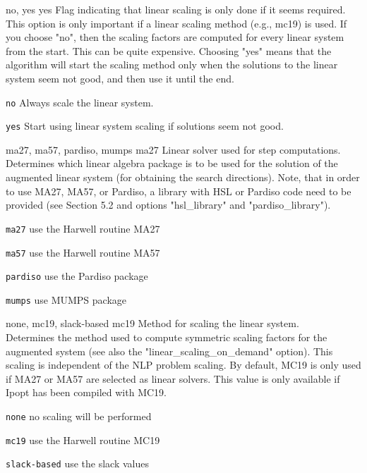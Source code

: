 %
{\ttfamily no, yes}%
{yes}%
{Flag indicating that linear scaling is only done if it seems required.\\
This option is only important if a linear scaling method (e.g., mc19) is used.  If you choose "no", then the scaling factors are computed for every linear system from the start.  This can be quite expensive. Choosing "yes" means that the algorithm will start the scaling method only when the solutions to the linear system seem not good, and then use it until the end.}%
{\begin{list}{}{
\setlength{\parsep}{0em}
\setlength{\leftmargin}{5ex}
\setlength{\labelwidth}{2ex}
\setlength{\itemindent}{0ex}
\setlength{\topsep}{0pt}}
\item[\texttt{no}] Always scale the linear system.
\item[\texttt{yes}] Start using linear system scaling if solutions seem not good.
\end{list}
}

%
{\ttfamily ma27, ma57, pardiso, mumps}%
{ma27}%
{Linear solver used for step computations.\\
Determines which linear algebra package is to be used for the solution of the augmented linear system (for obtaining the search directions). Note, that in order to use MA27, MA57, or Pardiso, a library with HSL or Pardiso code need to be provided (see Section 5.2 and options "hsl\_library" and "pardiso\_library").}%
{\begin{list}{}{
\setlength{\parsep}{0em}
\setlength{\leftmargin}{5ex}
\setlength{\labelwidth}{2ex}
\setlength{\itemindent}{0ex}
\setlength{\topsep}{0pt}}
\item[\texttt{ma27}] use the Harwell routine MA27
\item[\texttt{ma57}] use the Harwell routine MA57
\item[\texttt{pardiso}] use the Pardiso package
\item[\texttt{mumps}] use MUMPS package
\end{list}
}

%
{\ttfamily none, mc19, slack-based}%
{mc19}%
{Method for scaling the linear system.\\
Determines the method used to compute symmetric scaling factors for the augmented system (see also the "linear\_scaling\_on\_demand" option).  This scaling is independent of the NLP problem scaling.  By default, MC19 is only used if MA27 or MA57 are selected as linear solvers. This value is only available if Ipopt has been compiled with MC19.}%
{\begin{list}{}{
\setlength{\parsep}{0em}
\setlength{\leftmargin}{5ex}
\setlength{\labelwidth}{2ex}
\setlength{\itemindent}{0ex}
\setlength{\topsep}{0pt}}
\item[\texttt{none}] no scaling will be performed
\item[\texttt{mc19}] use the Harwell routine MC19
\item[\texttt{slack-based}] use the slack values
\end{list}
}

